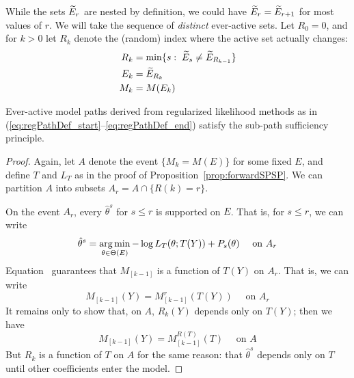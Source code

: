 \documentclass{article}
\begin{document}
While the sets $\widetilde{E}_r$ are nested by definition, we could have $\widetilde{E}_r = \widetilde{E}_{r+1}$ for most values of $r$. We will take the sequence of {\em distinct} ever-active sets. Let $R_0=0$, and for $k>0$ let $R_k$ denote the (random) index where the active set actually changes:
\begin{align}
  R_k &= \min\{s:\; \widetilde{E}_s \neq \widetilde{E}_{R_{k-1}}\}\\
  E_k &= \widetilde{E}_{R_k}\\
  \label{eq:regPathDef_end}
  M_k &= M(E_k)
\end{align}

\begin{proposition}\label{prop:regPathSPSP}
Ever-active model paths derived from regularized likelihood methods as in (\ref{eq:regPathDef_start}--\ref{eq:regPathDef_end}) satisfy the sub-path sufficiency principle.
\end{proposition}

\begin{proof}
  Again, let $A$ denote the event $\{M_k = M(E)\}$ for some fixed $E$, and define $T$ and $L_T$ as in the proof of Proposition~\ref{prop:forwardSPSP}. We can partition $A$ into subsets $A_r = A \cap \{R(k)=r\}$.

On the event $A_r$, every $\hat\theta^s$ for $s\leq r$ is supported on $E$. That is, for $s \leq r$, we can write 
\begin{equation}\label{eq:onlyT_Ar}
  \hat\theta^{s} = 
  \operatorname*{arg\,min}_{\theta\in\Theta(E)} -\log L_T(\theta; T(Y)) + P_s(\theta) \quad \text{ on } A_r
\end{equation}
Equation~\label{eq:onlyT_Ar} guarantees that $M_{[k-1]}$ is a function of $T(Y)$ on $A_r$. That is, we can write
\[
M_{[k-1]}(Y) = M_{[k-1]}^r(T(Y)) \quad \text{ on } A_r
\]
It remains only to show that, on $A$, $R_k(Y)$ depends only on $T(Y)$; then we have
\[
M_{[k-1]}(Y) = M_{[k-1]}^{R(T)}(T) \quad \text{ on } A
\]
But $R_k$ is a function of $T$ on $A$ for the same reason: that $\hat\theta^s$ depends only on $T$ until other coefficients enter the model.
\end{proof}

\begin{comment}
\WFcomment{There is a filtration interpretation when you have the appropriate sufficiency properties.} Let $\sF_{k,\ell}$ denote the $\sigma$-algebra generated by $M_{[k]}$ and $p_{[\ell]}$.
\begin{align*}
  \sF_{k,\ell} &= \sF(M_{[k]},p_{[\ell]})\\
  \sF_0 &\underlabel_{\text{selection } 1} \sF_{1,0} \underlabel_{\text{inference } 1}
  \sF_{1,1} \;\;\sub \cdots \sub\;\;
  \sF_{d-1,d-1} \underlabel_{\text{selection } d} \sF_{d,d-1}
  \underlabel_{\text{inference } d} \sF_{d,d}
\end{align*}
\end{comment}
\end{document}
